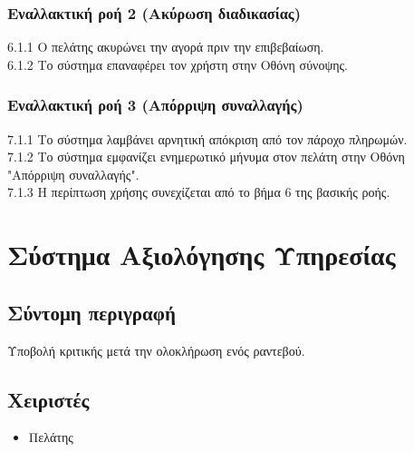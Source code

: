 \documentclass[12pt,a4paper,twoside]{book}
\begin{document}
\subsubsection*{Εναλλακτική ροή 2 (Ακύρωση διαδικασίας)}
6.1.1 Ο πελάτης ακυρώνει την αγορά πριν την επιβεβαίωση.\\
\hspace*{\parindent}6.1.2 Το σύστημα επαναφέρει τον χρήστη στην Οθόνη σύνοψης.


\subsubsection*{Εναλλακτική ροή 3 (Απόρριψη συναλλαγής)}
7.1.1 Το σύστημα λαμβάνει αρνητική απόκριση από τον πάροχο πληρωμών.\\
\hspace*{\parindent}7.1.2 Το σύστημα εμφανίζει ενημερωτικό μήνυμα στον πελάτη στην Οθόνη "Απόρριψη συναλλαγής".\\
\hspace*{\parindent}7.1.3 Η περίπτωση χρήσης συνεχίζεται από το βήμα 6 της βασικής ροής.

\section{Σύστημα Αξιολόγησης Υπηρεσίας}

\subsection{Σύντομη περιγραφή}
Υποβολή κριτικής μετά την ολοκλήρωση ενός ραντεβού.

\subsection{Χειριστές}
\begin{itemize}
    \item Πελάτης
\end{itemize}
\end{document}
